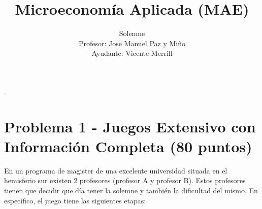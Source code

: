 \documentclass[11pt]{article}
\title{Microeconom\'ia Aplicada (MAE)}
\author{Solemne \\ Profesor: Jose Manuel Paz y Mi\~no \\ Ayudante: Vicente Merrill}
\date{}
\newcommand{\blankline}{\quad\pagebreak[2]}
\begin{document}
\maketitle

\blankline

\setlength{\parindent}{0pt}.


\section*{Problema 1 - Juegos Extensivo con Informaci\'on Completa (80 puntos)}

En un programa de magister de una excelente universidad situada en el hemisferio sur existen 2 profesores (profesor A y profesor B). Estos profesores tienen que decidir que d\'ia tener la solemne y tambi\'en la dificultad del mismo. En espec\'ifico, el juego tiene las siguientes etapas:
\end{document}
